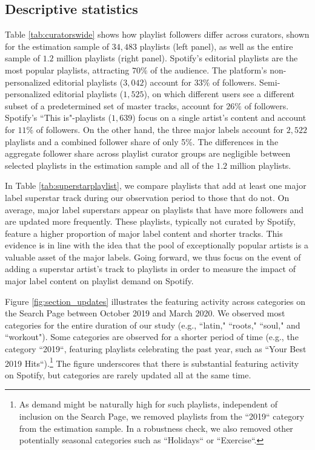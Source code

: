 \documentclass[12pt, a4paper, leqno]{article}
\begin{document}
\subsection{Descriptive statistics}

Table \ref{tab:curatorswide} shows how playlist followers differ across curators, shown for the estimation sample of $34,483$ playlists (left panel), as well as the entire sample of $1.2$ million playlists (right panel). 
Spotify’s editorial playlists are the most popular playlists, attracting $70\%$ of the audience. The platform's non-personalized editorial playlists ($3,042$) account for $33\%$ of followers. Semi-personalized editorial playlists ($1,525$), on which different users see a different subset of a predetermined set of master tracks, account for $26\%$ of followers. Spotify's ``This is"-playlists ($1,639$) focus on a single artist's content and account for $11\%$ of followers. On the other hand, the three major labels account for $2,522$ playlists and a combined follower share of only 5\%. The differences in the aggregate follower share across playlist curator groups are negligible between selected playlists in the estimation sample and all of the $1.2$ million playlists.



In Table \ref{tab:superstarplaylist}, we compare playlists that add at least one major label superstar track during our observation period to those that do not. On average, major label superstars appear on playlists that have more followers and are updated more frequently. These playlists, typically not curated by Spotify, feature a higher proportion of major label content and shorter tracks. This evidence is in line with the idea that the pool of exceptionally popular artists is a valuable asset of the major labels. Going forward, we thus focus on the event of adding a superstar artist's track to playlists in order to measure the impact of major label content on playlist demand on Spotify.



Figure \ref{fig:section_updates} illustrates the featuring activity across categories on the Search Page between October 2019 and March 2020. We observed most categories for the entire duration of our study (e.g., ``latin," ``roots," ``soul," and ``workout"). Some categories are observed for a shorter period of time (e.g., the category ``2019``, featuring playlists celebrating the past year, such as ``Your Best 2019 Hits``).\footnote{As demand might be naturally high for such playlists, independent of inclusion on the Search Page, we removed playlists from the ``2019`` category from the estimation sample. In a robustness check, we also removed other potentially seasonal categories such as ``Holidays`` or ``Exercise``.} The figure underscores that there is substantial featuring activity on Spotify, but categories are rarely updated all at the same time. 
\end{document}
